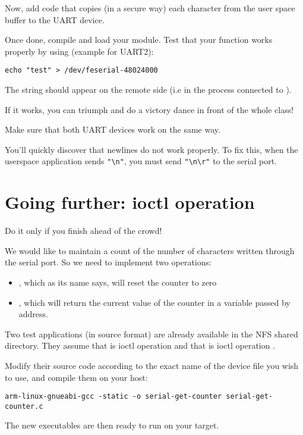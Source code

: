 Now, add code that copies (in a secure way) each character from the
user space buffer to the UART device. 

Once done, compile and load your module. Test that your  function
works properly by using (example for UART2):

\begin{verbatim}
echo "test" > /dev/feserial-48024000
\end{verbatim}

The  string should appear on the remote side (i.e in
the  process connected to ).

If it works, you can triumph and do a victory dance in front of the
whole class!

Make sure that both UART devices work on the same way.

You'll quickly discover that newlines do not work properly. To fix
this, when the userspace application sends \verb+"\n"+, you must send
\verb+"\n\r"+ to the serial port.

\section{Going further: ioctl operation}

Do it only if you finish ahead of the crowd!

We would like to maintain a count of the number of characters
written through the serial port. So we need to implement two
 operations:
\begin{itemize}

 \item {}, which as its name says, will
   reset the counter to zero

 \item {}, which will return the current
   value of the counter in a variable passed by address.

\end{itemize}

Two test applications (in source format) are already available in the
 NFS shared directory.  
They assume that  is ioctl operation 
and that  is ioctl operation .

Modify their source code according to the exact name of the device file
you wish to use, and compile them on your host:

\begin{verbatim}
arm-linux-gnueabi-gcc -static -o serial-get-counter serial-get-counter.c
\end{verbatim}

The new executables are then ready to run on your target.
